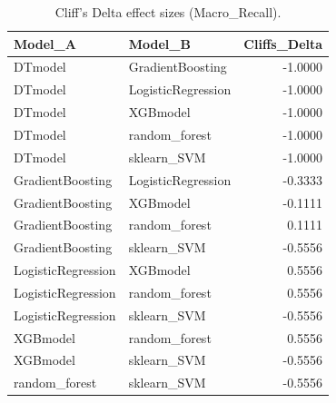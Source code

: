 \begin{table}[t]
\centering
\begin{tabular}{llr}
\toprule
Model_A & Model_B & Cliffs_Delta \\
\midrule
DTmodel & GradientBoosting & -1.0000 \\
DTmodel & LogisticRegression & -1.0000 \\
DTmodel & XGBmodel & -1.0000 \\
DTmodel & random_forest & -1.0000 \\
DTmodel & sklearn_SVM & -1.0000 \\
GradientBoosting & LogisticRegression & -0.3333 \\
GradientBoosting & XGBmodel & -0.1111 \\
GradientBoosting & random_forest & 0.1111 \\
GradientBoosting & sklearn_SVM & -0.5556 \\
LogisticRegression & XGBmodel & 0.5556 \\
LogisticRegression & random_forest & 0.5556 \\
LogisticRegression & sklearn_SVM & -0.5556 \\
XGBmodel & random_forest & 0.5556 \\
XGBmodel & sklearn_SVM & -0.5556 \\
random_forest & sklearn_SVM & -0.5556 \\
\bottomrule
\end{tabular}
\caption{Cliff's Delta effect sizes (Macro_Recall).}
\label{tab:cliffs_Macro_Recall}
\end{table}